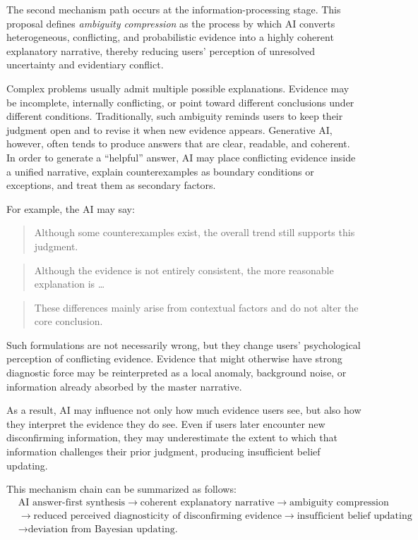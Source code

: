 The second mechanism path occurs at the information-processing stage. This proposal defines \emph{ambiguity compression} as the process by which AI converts heterogeneous, conflicting, and probabilistic evidence into a highly coherent explanatory narrative, thereby reducing users' perception of unresolved uncertainty and evidentiary conflict.

Complex problems usually admit multiple possible explanations. Evidence may be incomplete, internally conflicting, or point toward different conclusions under different conditions. Traditionally, such ambiguity reminds users to keep their judgment open and to revise it when new evidence appears. Generative AI, however, often tends to produce answers that are clear, readable, and coherent. In order to generate a ``helpful'' answer, AI may place conflicting evidence inside a unified narrative, explain counterexamples as boundary conditions or exceptions, and treat them as secondary factors.

For example, the AI may say:
\begin{quote}
Although some counterexamples exist, the overall trend still supports this judgment.
\end{quote}
\begin{quote}
Although the evidence is not entirely consistent, the more reasonable explanation is \ldots
\end{quote}
\begin{quote}
These differences mainly arise from contextual factors and do not alter the core conclusion.
\end{quote}

Such formulations are not necessarily wrong, but they change users' psychological perception of conflicting evidence. Evidence that might otherwise have strong diagnostic force may be reinterpreted as a local anomaly, background noise, or information already absorbed by the master narrative.

As a result, AI may influence not only how much evidence users see, but also how they interpret the evidence they do see. Even if users later encounter new disconfirming information, they may underestimate the extent to which that information challenges their prior judgment, producing insufficient belief updating.

This mechanism chain can be summarized as follows:
\[
\begin{aligned}
&\text{AI answer-first synthesis}
\rightarrow
\text{coherent explanatory narrative}
\rightarrow
\text{ambiguity compression} \\
&\rightarrow
\text{reduced perceived diagnosticity of disconfirming evidence}
\rightarrow
\text{insufficient belief updating} \\
&\rightarrow
\text{deviation from Bayesian updating.}
\end{aligned}
\]

